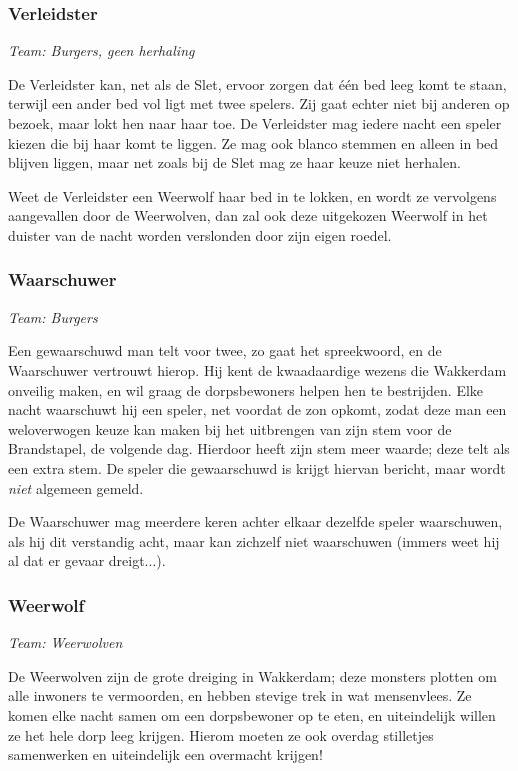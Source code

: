 \documentclass[12pt]{article}
\begin{document}
    \subsubsection{Verleidster}
      \emph{\scriptsize Team: Burgers, geen herhaling}
    
      De Verleidster kan, net als de Slet, ervoor zorgen dat \'e\'en bed leeg komt te staan, terwijl een ander bed vol ligt met twee spelers. Zij gaat echter niet bij anderen op bezoek, maar lokt hen naar haar toe. De Verleidster mag iedere nacht een speler kiezen die bij haar komt te liggen. Ze mag ook blanco stemmen en alleen in bed blijven liggen, maar net zoals bij de Slet mag ze haar keuze niet herhalen.
    
      Weet de Verleidster een Weerwolf haar bed in te lokken, en wordt ze vervolgens aangevallen door de Weerwolven, dan zal ook deze uitgekozen Weerwolf in het duister van de nacht worden verslonden door zijn eigen roedel.
    
    \subsubsection{Waarschuwer}
      \emph{\scriptsize Team: Burgers}
    
      Een gewaarschuwd man telt voor twee, zo gaat het spreekwoord, en de Waarschuwer vertrouwt hierop. Hij kent de kwaadaardige wezens die Wakkerdam onveilig maken, en wil graag de dorpsbewoners helpen hen te bestrijden. Elke nacht waarschuwt hij een speler, net voordat de zon opkomt, zodat deze man een weloverwogen keuze kan maken bij het uitbrengen van zijn stem voor de Brandstapel, de volgende dag. Hierdoor heeft zijn stem meer waarde; deze telt als een extra stem. De speler die gewaarschuwd is krijgt hiervan bericht, maar wordt \emph{niet} algemeen gemeld.
    
      De Waarschuwer mag meerdere keren achter elkaar dezelfde speler waarschuwen, als hij dit verstandig acht, maar kan zichzelf niet waarschuwen (immers weet hij al dat er gevaar dreigt...).
    
    \subsubsection{Weerwolf}
      \emph{\scriptsize Team: Weerwolven}
    
      De Weerwolven zijn de grote dreiging in Wakkerdam; deze monsters plotten om alle inwoners te vermoorden, en hebben stevige trek in wat mensenvlees. Ze komen elke nacht samen om een dorpsbewoner op te eten, en uiteindelijk willen ze het hele dorp leeg krijgen. Hierom moeten ze ook overdag stilletjes  samenwerken en uiteindelijk een overmacht krijgen!
    
\end{document}

